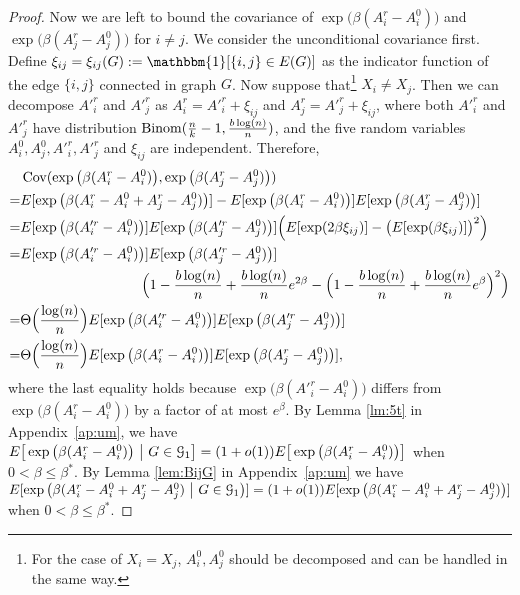 \documentclass{article}
\begin{document}
\begin{proof}
Now we are left to bound the covariance of $\exp\big(\beta (A^r_i-A^0_i) \big)$ and $\exp\big(\beta (A^r_j-A^0_j) \big)$ for $i\neq j$.
We consider the unconditional covariance first.
Define $\xi_{ij}=\xi_{ij}(G):=\mathbbm{1}[\{i,j\}\in E(G)]$ as the indicator function of the edge $\{i,j\}$ connected in graph $G$.
Now suppose that\footnote{For the case of $X_i=X_j$, $A_i^0, A_j^0$ should be decomposed and can be handled in the same way.}
$X_i\neq X_j$. Then we can decompose $A'^r_i$ and $A'^r_j$ as $A^r_i=A'^r_i+\xi_{ij}$ and $A^r_j=A'^r_j+\xi_{ij}$, where both $A'^r_i$ and $A'^r_j$ have distribution $\operatorname{Binom}(\frac{n}{k} - 1 , \frac{b\log(n)}{n})$,
and the five random variables $A^0_i, A^0_j, A'^r_i,A'^r_j$ and $\xi_{ij}$ are independent.
Therefore,
\begin{align*}
& \operatorname{Cov}(\exp\big(\beta (A^r_i-A^0_i) \big), \exp\big(\beta (A^r_j-A^0_j) \big) ) \\
= & E[\exp\big(\beta (A^r_i-A^0_i+A^r_j-A^0_j) \big)] 
-E[\exp\big(\beta (A^r_i-A^0_i) \big)] E[\exp\big(\beta (A^r_j-A^0_j) \big)]   \\
= & E[\exp\big(\beta (A'^r_i-A^0_i) \big)] E[\exp\big(\beta (A'^r_j-A^0_j) \big)]  \Big( E[\exp(2\beta \xi_{ij})] -
\big(E[\exp(\beta \xi_{ij})]\big)^2 \Big) \\
= & E[\exp\big(\beta (A'^r_i-A^0_i) \big)] E[\exp\big(\beta (A'^r_j-A^0_j) \big)] \\
& \hspace*{1.2in}
\Big( 1-\frac{b\log(n)}{n} + \frac{b\log(n)}{n} e^{2\beta} -
\Big(1-\frac{b\log(n)}{n} + \frac{b\log(n)}{n} e^{\beta} \Big)^2 \Big) \\
= & \Theta\Big( \frac{\log(n)}{n} \Big) E[\exp\big(\beta (A'^r_i-A^0_i) \big)] E[\exp\big(\beta (A'^r_j-A^0_j) \big)] \\
= & \Theta\Big( \frac{\log(n)}{n} \Big) E[\exp\big(\beta (A^r_i-A^0_i) \big)] E[\exp\big(\beta (A^r_j-A^0_j) \big)]  ,
\end{align*} 
where the last equality holds because $\exp\big(\beta (A'^r_i-A^0_i) \big)$ differs from $\exp\big(\beta (A^r_i-A^0_i) \big)$  by a factor of at most $e^{\beta}$. 
By Lemma \ref{lm:5t} in Appendix~\ref{ap:um}, we have $E \big[  \exp\big(\beta (A^r_i-A^0_i) \big) ~\big|~ G\in\mathcal{G}_1 \big] 
= (1+o(1)) E \big[  \exp\big(\beta (A^r_i-A^0_i) \big) \big]$ when $0<\beta\le\beta^\ast$.
By Lemma \ref{lem:BijG} in Appendix~\ref{ap:um} we have $E[\exp\big(\beta (A^r_i-A^0_i+A^r_j-A^0_j) ~\big|~ G\in\mathcal{G}_1 \big)] = (1+o(1)) E[\exp\big(\beta (A^r_i-A^0_i+A^r_j-A^0_j) \big)]$ when $0<\beta\le\beta^\ast$.

\end{proof}
\end{document}
